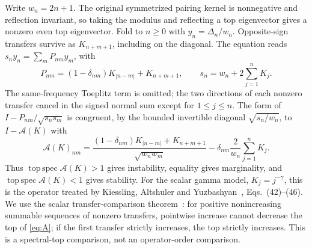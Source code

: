 \documentclass[11pt]{article}
\newcommand{\topsp}{\operatorname{top\,spec}}
\begin{document}
Write $w_n=2n+1$. The original symmetrized pairing kernel is nonnegative and reflection invariant, so taking the modulus and reflecting a top eigenvector gives a nonzero even top eigenvector. Fold to $n\ge0$ with $y_n=\Delta_n/w_n$. Opposite-sign transfers survive as $K_{n+m+1}$, including on the diagonal. The equation reads $s_n y_n=\sum_mP_{nm}y_m$, with
\[
 P_{nm}=(1-\delta_{nm})K_{|n-m|}+K_{n+m+1},\qquad
 s_n=w_n+2\sum_{j=1}^nK_j.
\]
The same-frequency Toeplitz term is omitted; the two directions of each nonzero transfer cancel in the signed normal sum except for $1\le j\le n$. The form of $I-P_{nm}/\sqrt{s_ns_m}$ is congruent, by the bounded invertible diagonal $\sqrt{s_n/w_n}$, to $I-\mathcal A(K)$ with
\begin{equation}
 \mathcal A(K)_{nm}=\frac{(1-\delta_{nm})K_{|n-m|}+K_{n+m+1}}{\sqrt{w_nw_m}}
 -\delta_{nm}\frac{2}{w_n}\sum_{j=1}^{n}K_j .
 \label{eq:A}
\end{equation}
Thus $\topsp\mathcal A(K)>1$ gives instability, equality gives marginality, and $\topsp\mathcal A(K)<1$ gives stability. For the scalar gamma model, $K_j=j^{-\gamma}$, this is the operator treated by Kiessling, Altshuler and Yuzbashyan~\cite{KAY}, Eqs.~(42)--(46). We use the scalar transfer-comparison theorem~\cite{Kondratev,Rens}: for positive nonincreasing summable sequences of nonzero transfers, pointwise increase cannot decrease the top of \eqref{eq:A}; if the first transfer strictly increases, the top strictly increases. This is a spectral-top comparison, not an operator-order comparison.
\end{document}
